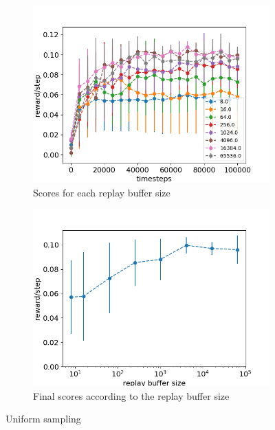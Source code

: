 \documentclass{article}
\begin{document}
\begin{figure}[H]
  \centering
    \begin{subfigure}[b]{0.45\linewidth}
    \includegraphics[width=\linewidth]{Study_1/1.1/curves1_1.png}
    \caption{Scores for each replay buffer size}
    \end{subfigure}
    \begin{subfigure}[b]{0.45\linewidth}
    \includegraphics[width=\linewidth]{Study_1/1.1/total_scores1_1.png}
    \caption{Final scores according to the replay buffer size}
    \end{subfigure}
    \caption{Uniform sampling}
  \label{fig:scores_uniform}
\end{figure}
\end{document}
